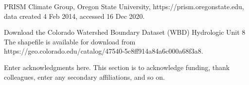 \documentclass[draft]{agujournal2019}
\begin{document}
PRISM Climate Group, Oregon State University, https://prism.oregonstate.edu, data created 4 Feb 2014, accessed 16 Dec 2020.

Download the Colorado Watershed Boundary Dataset (WBD) Hydrologic Unit 8
The shapefile is available for download from https://geo.colorado.edu/catalog/47540-5c8ff914a84a6c000a68f3a8.


\acknowledgments
Enter acknowledgments here. This section is to acknowledge funding, thank colleagues, enter any secondary affiliations, and so on.


%
%





%
%
%
%
%
\end{document}
